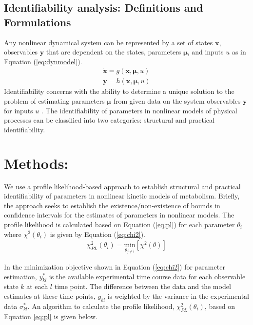 \documentclass[10pt]{article}
\begin{document}
	
	
	\subsection{Identifiability analysis: Definitions and Formulations}
	Any nonlinear dynamical system can be represented by a set of states $\mathbf{x}$, observables $\mathbf{y}$ that are dependent on the states, parameters $\mathbf{\mu}$, and inputs $u$ as in Equation (\ref{eq:dynmodel}). 
	\begin{subequations}\label{eq:dynmodel}
		\begin{align}
		\dot{\mathbf{x}} = g(\mathbf{x},\mathbf{\mu},u)\\
		\mathbf{y} = h(\mathbf{x},\mathbf{\mu},u)
		\end{align}
	\end{subequations}
	Identifiability concerns with the ability to determine a unique solution to the problem of estimating parameters $\mathbf{\mu}$ from given data on the system observables $\mathbf{y}$ for inputs $u$ \parencite{McLean2012}.	The identifiability of parameters in nonlinear models of physical processes can be classified into two categories: structural and practical identifiability. 
		
	
	
	\section{Methods:}
	 We use a profile likelihood-based approach \parencite{Raue2009a} to establish structural and practical identifiability of parameters in nonlinear kinetic models of metabolism. Briefly, the approach seeks to establish the existence/non-existence of bounds in confidence intervals for the estimates of parameters in nonlinear models. The profile likelihood is calculated based on Equation (\ref{eq:pl}) for each parameter $\theta_i$ where $\chi^2(\theta_i)$ is given by Equation (\ref{eq:chi2}).
	 \begin{align}\label{eq:pl}
	 \chi_{PL}^2(\theta_i) = \underset{\theta_{j\ne i}}{\mathrm{min}} \left[\chi^2(\theta)\right]
	 \end{align}
	 
	 In the minimization objective shown in Equation (\ref{eq:chi2}) for parameter estimation, $y_{kl}^*$ is the available experimental time course data for each observable state $k$ at each $l$ time point. The difference between the data and the model estimates at these time points, $y_{kl}$ is weighted by the variance in the experimental data $\sigma_{kl}^*$. An algorithm to calculate the profile likelihood, $\chi_{PL}^2(\theta_i)$, based on Equation \ref{eq:pl} is given below.
	 
\end{document}
